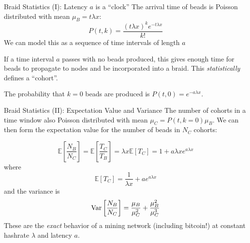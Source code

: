 \documentclass[tikz,mathserif,usenames,dvipsnames,svgnames,table]{beamer}
\begin{document}
\begin{frame}{Braid Statistics (I): Latency $a$ is a ``clock''}
    The arrival time of beads is Poisson distributed with mean $\mu_B = t\lambda x$:
    \begin{equation}
        P(t,k)
        = \frac{(t \lambda x)^k e^{-t \lambda x}}{k!}
    \end{equation}
    We can model this as a sequence of time intervals of length $a$

    \begin{center}
    \end{center}

    If a time interval $a$ passes with no beads produced, this gives enough time for beads to
    propagate to nodes and be incorporated into a braid. This {\it statistically} defines a
    ``cohort''.

    The probability that $k=0$ beads are produced is $P(t, 0) = e^{-a\lambda x}$.

\end{frame}
\begin{frame}{Braid Statistics (II): Expectation Value and Variance}
    The number of cohorts in a time window also Poisson distributed with mean $\mu_C = P(t,
    k=0)\mu_B$. We can then form the expectation value for the number of beads in $N_C$ cohorts:

    \begin{equation}
        \mathbb{E}\left[\frac{N_B}{N_C}\right] =
        \mathbb{E}\left[\frac{T_C}{T_B}\right] =
        \lambda x \mathbb{E}[T_C]
        = 1 + a\lambda x e^{a\lambda x}
    \end{equation}
    where
    \begin{equation}
        \mathbb{E}[T_C] = \frac{1}{\lambda x} + a e^{a\lambda x}
    \end{equation}
    and the variance is
    \begin{equation}
        {\rm Var}\left[\frac{N_B}{N_C}\right] = \frac{\mu_B}{\mu_C^2} + \frac{\mu_B^2}{\mu_C^3}
    \end{equation}
    These are the {\it exact} behavior of a mining network (including bitcoin!) at constant hashrate
    $\lambda$ and latency $a$.
\end{frame}
\end{document}
